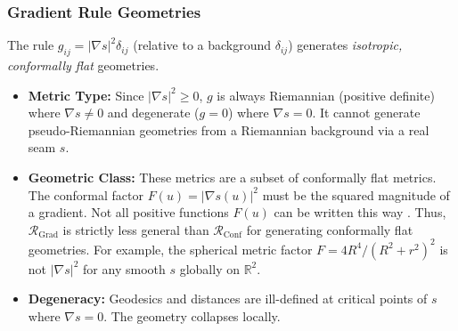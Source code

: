 \documentclass[twoside,twocolumn]{article}
\numberwithin{equation}{section} %
\begin{document}
\subsubsection{Gradient Rule Geometries}
The rule \( g_{ij} = |\nabla s|^2 \delta_{ij} \) (relative to a background \( \delta_{ij} \)) generates \emph{isotropic, conformally flat} geometries.
\begin{itemize}
    \item \textbf{Metric Type:} Since \( |\nabla s|^2 \ge 0 \), \( g \) is always Riemannian (positive definite) where \( \nabla s \neq 0 \) and degenerate (\( g=0 \)) where \( \nabla s = 0 \). It cannot generate pseudo-Riemannian geometries from a Riemannian background via a real seam \( s \).
    \item \textbf{Geometric Class:} These metrics are a subset of conformally flat metrics. The conformal factor \( F(u) = |\nabla s(u)|^2 \) must be the squared magnitude of a gradient. Not all positive functions \( F(u) \) can be written this way \cite{Sethian1999}. %
    Thus, \( \mathcal{R}_{\text{Grad}} \) is strictly less general than \( \mathcal{R}_{\text{Conf}} \) for generating conformally flat geometries. For example, the spherical metric factor \( F=4R^4/(R^2+r^2)^2 \) is not \( |\nabla s|^2 \) for any smooth \( s \) globally on \( \mathbb{R}^2 \).
    \item \textbf{Degeneracy:} Geodesics and distances are ill-defined at critical points of \( s \) where \( \nabla s = 0 \). The geometry collapses locally.
\end{itemize}
\end{document}
